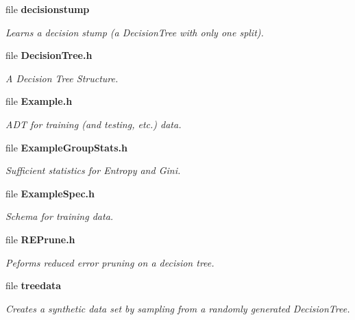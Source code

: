 \begin{CompactItemize}
\item 
file {\bf decisionstump}
\begin{CompactList}\small\item\em Learns a decision stump (a Decision\-Tree with only one split). \item\end{CompactList}

\item 
file {\bf Decision\-Tree.h}
\begin{CompactList}\small\item\em A Decision Tree Structure. \item\end{CompactList}

\item 
file {\bf Example.h}
\begin{CompactList}\small\item\em ADT for training (and testing, etc.) data. \item\end{CompactList}

\item 
file {\bf Example\-Group\-Stats.h}
\begin{CompactList}\small\item\em Sufficient statistics for Entropy and Gini. \item\end{CompactList}

\item 
file {\bf Example\-Spec.h}
\begin{CompactList}\small\item\em Schema for training data. \item\end{CompactList}

\item 
file {\bf REPrune.h}
\begin{CompactList}\small\item\em Peforms reduced error pruning on a decision tree. \item\end{CompactList}

\item 
file {\bf treedata}
\begin{CompactList}\small\item\em Creates a synthetic data set by sampling from a randomly generated Decision\-Tree. \item\end{CompactList}


\end{CompactItemize}
